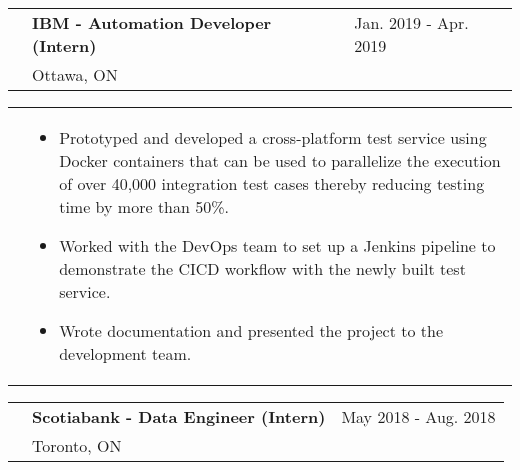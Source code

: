 \documentclass[letter, 10.5pt]{article}
\newcommand\workspacing{0.4cm}
\newcommand\bulletspacing{-0.15cm}
\newcommand\firstcolwidth{2.5cm}
\newcommand\listwidth{0.809\textwidth}
\begin{document}
    \newline
    \vspace{\workspacing}
    \newline
    \begin{tabularx}{\textwidth}{@{}p{\firstcolwidth}Xl}
        & \textbf{IBM - Automation Developer (Intern)} & Jan. 2019 - Apr. 2019 \\
        & Ottawa, ON & \\
    \end{tabularx}
    \newline
    \begin{tabularx}{\textwidth}{@{}p{\firstcolwidth}X}
        & 
        \begin{minipage}[t]{\listwidth}
            \begin{itemize}
                \vspace{-0.3cm}
                \item Prototyped and developed a cross-platform test service using Docker containers that can be used to parallelize the execution of over 40,000 integration test cases thereby reducing testing time by more than 50\%.
                \vspace{\bulletspacing}
                \item Worked with the DevOps team to set up a Jenkins pipeline to demonstrate the CICD workflow with the newly built test service.
                \vspace{\bulletspacing}
                \item Wrote documentation and presented the project to the development team.
            \end{itemize}
        \end{minipage} \\
    \end{tabularx}
    \newline
    \vspace{\workspacing}
    \newline
    \begin{tabularx}{\textwidth}{@{}p{\firstcolwidth}Xl}
        & \textbf{Scotiabank - Data Engineer (Intern)} & May 2018 - Aug. 2018 \\
        & Toronto, ON & \\
    \end{tabularx}
    \newline
\end{document}

